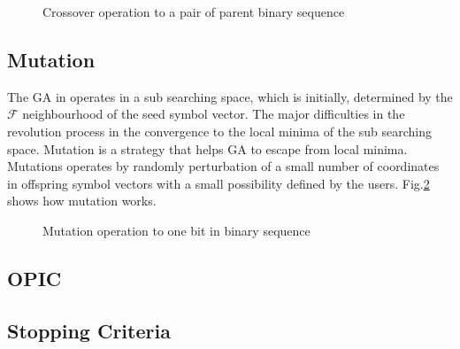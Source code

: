 \begin{figure}
\centering
\def\svgwidth{\columnwidth}

\caption{Crossover operation to a pair of parent binary sequence}
\label{crossover}
\end{figure}

\subsection{Mutation}
The GA in operates in a sub searching space, which is initially, determined by the $\mathcal{F}$ neighbourhood of the seed symbol vector. The major difficulties in the revolution process in the convergence to the local minima of the sub searching space. Mutation is a strategy that helps GA to escape from local minima. Mutations operates by randomly perturbation of a small number of coordinates in offspring symbol vectors with a small possibility defined by the users. Fig.\ref{mutation} shows how mutation works. 
\iffalse
\begin{figure}
\centering
\def\svgwidth{\columnwidth}

\caption{Mutation operation to one bit in binary sequence}
\label{mutaion}
\end{figure}
\fi


\begin{figure}
\centering
\def\svgwidth{\columnwidth}

\caption{Mutation operation to one bit in binary sequence}
\label{mutation}
\end{figure}


\subsection{OPIC} 
\subsection{Stopping Criteria}
 